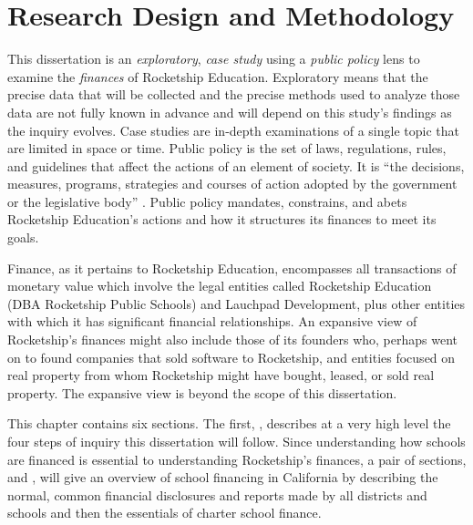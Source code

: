 
\chapter{Research Design and Methodology}\label{ch:methods}\indent

This dissertation is an \textit{exploratory}, \textit{case study} using a \textit{public policy} lens to examine the \textit{finances} of Rocketship Education. Exploratory means that the precise data that will be collected and the precise methods used to analyze those data are not fully known in advance and will depend on this study's findings as the inquiry evolves. Case studies are in-depth examinations of a single topic that are limited in space or time. Public policy is the set of laws, regulations, rules, and guidelines that affect the actions of an element of society. It is ``the decisions, measures, programs, strategies and courses of action adopted by the government or the legislative body'' \parencite[3]{Knill.Tosun2020}. Public policy mandates, constrains, and abets Rocketship Education's actions and how it structures its finances to meet its goals.

Finance, as it pertains to Rocketship Education, encompasses all transactions of monetary value which involve the legal entities called Rocketship Education (DBA Rocketship Public Schools) and Lauchpad Development, plus other entities with which it has significant financial relationships. An expansive view of Rocketship's finances might also include those of its founders who, perhaps went on to found companies that sold software to Rocketship, and entities focused on real property from whom Rocketship might have bought, leased, or sold real property. The expansive view is beyond the scope of this dissertation.

This chapter contains six sections. The first, , describes at a very high level the four steps of inquiry this dissertation will follow. Since understanding how schools are financed is essential to understanding Rocketship's finances, a pair of sections,  and , will give an overview of school financing in California by describing the normal, common financial disclosures and reports made by all districts and schools and then the essentials of charter school finance. 

